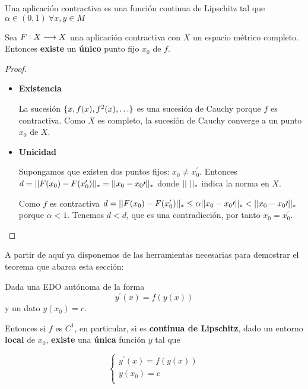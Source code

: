 \begin{definition}
Una aplicación contractiva es una función continua de Lipschitz tal que $\alpha \in (0,1)\ \forall x,y\in M$
\end{definition}

\begin{theorem}
Sea $F: X \longrightarrow X$ una aplicación contractiva con $X$ un espacio métrico completo. Entonces \textbf{existe} un \textbf{único} punto fijo $x_0$ de $f$. 
\end{theorem}
\begin{proof}
\begin{itemize}
\item \textbf{Existencia}

La sucesión $\{ x, f(x), f^2(x), \hdots \}$ es una sucesión de Cauchy porque $f$ es contractiva. Como $X$ es completo, la sucesión de Cauchy converge a un punto $x_0$ de $X$.

\item \textbf{Unicidad}

Supongamos que existen dos puntos fijos: $x_0 \neq x_0^\prime$. Entonces $d = ||F(x_0)-F(x_0^\prime)||_* = ||x_0-x_0\prime||_*$ donde $\norm{\ }_*$ indica la norma en $X$.

Como $f$ es contractiva $d = ||F(x_0)-F(x_0^\prime)||_* \leq \alpha||x_0-x_0\prime||_* < ||x_0-x_0\prime||_*$ porque $\alpha < 1$. Tenemos $d\lt d$, que es una contradicción, por tanto $x_0 = x_0^\prime$.
\end{itemize}
\end{proof}

A partir de aquí ya disponemos de las herramientas necesarias para demostrar el teorema que abarca esta sección:

\begin{theorem}
Dada una EDO autónoma de la forma 
$$
y^\prime(x) = f(y(x))
$$
y un dato $y(x_0) = c$. 

Entonces si $f$ es $C^1$, en particular, si es \textbf{continua de Lipschitz}, dado un entorno \textbf{local} de $x_0$, \textbf{existe} una \textbf{única} función $y$ tal que

$$
\left\lbrace
  \begin{array}{l}
     y^\prime(x) = f(y(x)) \\
     y(x_0) = c  \\
  \end{array}
  \right.
$$
\end{theorem}

